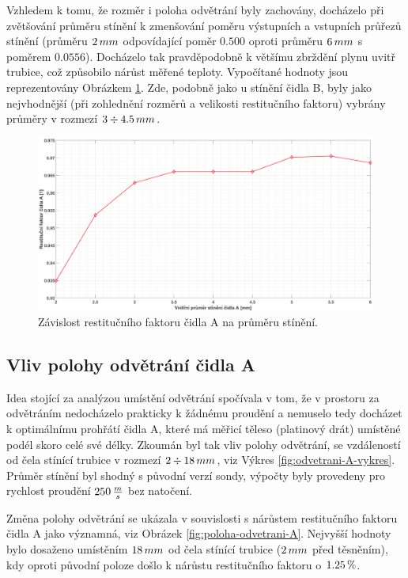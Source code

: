         \newpage
        Vzhledem k tomu, že rozměr i poloha odvětrání byly zachovány, docházelo při zvětšování průměru stínění k zmenšování poměru výstupních a vstupních průřezů stínění (průměru $2 \, mm$ odpovídající poměr $0.500$ oproti průměru $6 \, mm$ s poměrem $0.0556$). Docházelo tak pravděpodobně k většímu zbrždění plynu uvitř trubice, což způsobilo nárůst měřené teploty. Vypočítané hodnoty jsou reprezentovány Obrázkem \ref{fig:prumer-stineni-A}. Zde, podobně jako u stínění čidla B, byly jako nejvhodnější (při zohlednění rozměrů a velikosti restitučního faktoru) vybrány průměry v rozmezí $3 \div 4.5 \, mm$.
        
        \begin{figure}[ht!]
            \centering
            \includegraphics*[width=\textwidth]{400_SIMULACE_KONSTRUKCNICH_UPRAV/Grafy/05_prumer_stineni_A}
            \caption{Závislost restitučního faktoru čidla A na průměru stínění.}
            \label{fig:prumer-stineni-A}
        \end{figure}
    
   \newpage
     \subsection{Vliv polohy odvětrání čidla A}
        Idea stojící za analýzou umístění odvětrání spočívala v tom, že v prostoru za odvětráním nedocházelo prakticky k žádnému proudění a nemuselo tedy docházet k optimálnímu prohřátí čidla A, které má měřicí těleso (platinový drát) umístěné podél skoro celé své délky. Zkoumán byl tak vliv polohy odvětrání, se vzdáleností od čela stínící trubice v rozmezí $2 \div 18 \, mm$, viz Výkres \ref{fig:odvetrani-A-vykres}. Průměr stínění byl shodný s původní verzí sondy, výpočty byly provedeny pro rychlost proudění $250 \, \frac{m}{s}$ bez natočení.

        Změna polohy odvětrání se ukázala v souvislosti s nárůstem restitučního faktoru čidla A jako významná, viz Obrázek \ref{fig:poloha-odvetrani-A}. Nejvyšší hodnoty bylo dosaženo umístěním $18 \, mm$ od čela stínící trubice ($2 \, mm$ před těsněním), kdy oproti původní poloze došlo k nárůstu restitučního faktoru o $1.25 \, \%$.
        
